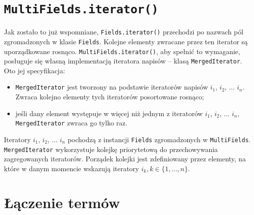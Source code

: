 \section{\texttt{MultiFields.iterator()}}

Jak zostało to już wspomniane, \texttt{Fields.iterator()} przechodzi po nazwach pól zgromadzonych w klasie \texttt{Fields}. Kolejne elementy zwracane przez ten iterator są uporządkowane rosnąco. \texttt{MultiFields.iterator()}, aby spełnić to wymaganie, posługuje się własną implementacją iteratora napisów -- klasą \texttt{MergedIterator}. Oto jej specyfikacja:
\begin{itemize}
 \item \texttt{MergedIterator} jest tworzony na podstawie iteratorów napisów $i_1$, $i_2$, ... $i_n$. Zwraca kolejno elementy tych iteratorów posortowane rosnąco; 
 \item jeśli dany element występuje w więcej niż jednym z iteratorów $i_1$, $i_2$, ... $i_n$, \texttt{MergedIterator} zwraca go tylko raz.
\end{itemize}
Iteratory $i_1$, $i_2$, ... $i_n$ pochodzą z instancji \texttt{Fields} zgromadzonych w \texttt{MultiFields}. \texttt{MergedIterator} wykorzystuje kolejkę priorytetową do przechowywania zagregowanych iteratorów. Porządek kolejki jest zdefiniowany przez elementy, na które w danym momencie wskazują iteratory $i_k, k \in \{1, ..., n\}$.

\section{Łączenie termów}

